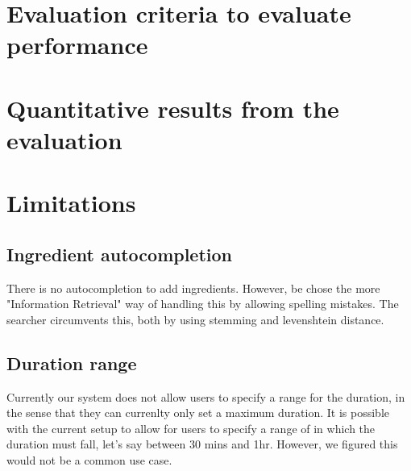\documentclass{article}
\begin{document}
\section{Evaluation criteria to evaluate performance}

\section{Quantitative results from the evaluation}

\section{Limitations}
\subsection{Ingredient autocompletion}
There is no autocompletion to add ingredients. However, be chose the more
"Information Retrieval" way of handling this by allowing spelling mistakes.
The searcher circumvents this, both by using stemming and levenshtein distance.
\subsection{Duration range}
Currently our system does not allow users to specify a range for the duration,
in the sense that they can currenlty only set a maximum duration.
It is possible with the current setup to allow for users to specify a range of
in which the duration must fall, let's say between 30 mins and 1hr. However,
we figured this would not be a common use case.
\end{document}
